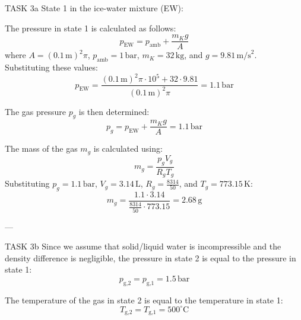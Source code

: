TASK 3a  
State 1 in the ice-water mixture (EW):  

The pressure in state 1 is calculated as follows:  
\[
p_{\text{EW}} = p_{\text{amb}} + \frac{m_K g}{A}
\]  
where \( A = (0.1 \, \text{m})^2 \pi \), \( p_{\text{amb}} = 1 \, \text{bar} \), \( m_K = 32 \, \text{kg} \), and \( g = 9.81 \, \text{m/s}^2 \). Substituting these values:  
\[
p_{\text{EW}} = \frac{(0.1 \, \text{m})^2 \pi \cdot 10^5 + 32 \cdot 9.81}{(0.1 \, \text{m})^2 \pi} = 1.1 \, \text{bar}
\]  

The gas pressure \( p_g \) is then determined:  
\[
p_g = p_{\text{EW}} + \frac{m_K g}{A} = 1.1 \, \text{bar}
\]  

The mass of the gas \( m_g \) is calculated using:  
\[
m_g = \frac{p_g V_g}{R_g T_g}
\]  
Substituting \( p_g = 1.1 \, \text{bar} \), \( V_g = 3.14 \, \text{L} \), \( R_g = \frac{8314}{50} \), and \( T_g = 773.15 \, \text{K} \):  
\[
m_g = \frac{1.1 \cdot 3.14}{\frac{8314}{50} \cdot 773.15} = 2.68 \, \text{g}
\]  

---

TASK 3b  
Since we assume that solid/liquid water is incompressible and the density difference is negligible, the pressure in state 2 is equal to the pressure in state 1:  
\[
p_{\text{g,2}} = p_{\text{g,1}} = 1.5 \, \text{bar}
\]  

The temperature of the gas in state 2 is equal to the temperature in state 1:  
\[
T_{\text{g,2}} = T_{\text{g,1}} = 500^\circ \text{C}
\]